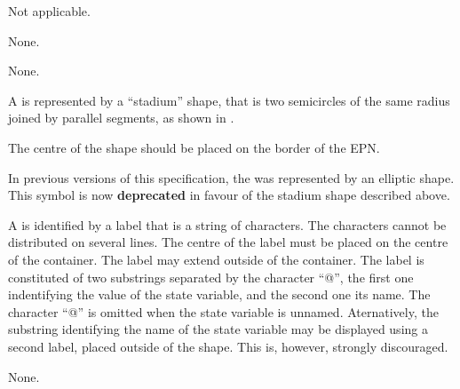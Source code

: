 \begin{glyphDescription}

\glyphSboTerm
Not applicable.


\glyphIncoming
None.



\glyphOutgoing
None.


\glyphContainer
A  is represented by a ``stadium'' shape, that is two semicircles of the same radius joined by parallel segments, as shown in .

The centre of the shape should be placed on the border of the EPN.

% 
In previous versions of this specification, the  was represented by an elliptic shape.
This symbol is now \textbf{deprecated} in favour of the stadium shape described above.

% 



\glyphLabel
A  is identified by a label that is  a string of characters.
The characters cannot be distributed on several lines.
The centre of the label must be placed on the centre of the container.
The label may extend outside of the container.
The label is constituted of two substrings separated by the character ``@'', the first one indentifying the value of the state variable, and the second one its name.
The character ``@'' is omitted when the state variable is unnamed.
Aternatively, the substring identifying the name of the state variable may be displayed using a second label, placed outside of the shape.
This is, however, strongly discouraged.



\glyphAux
None.

\end{glyphDescription}

